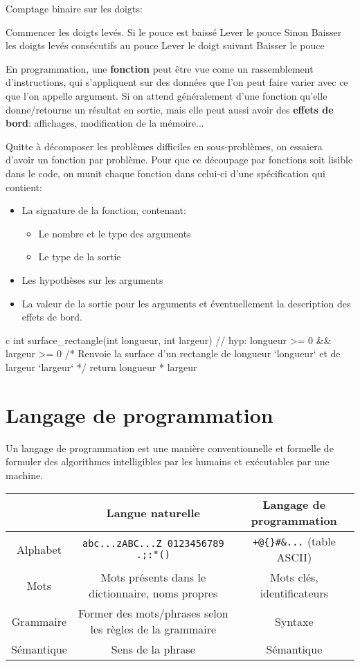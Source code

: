 \documentclass{scrartcl}
\begin{document}
		\exemple Comptage binaire sur les doigts:
		\begin{algotext}
Commencer les doigts levés.
Si le pouce est baissé
	Lever le pouce
Sinon
	Baisser les doigts levés consécutifs au pouce
	Lever le doigt suivant
	Baisser le pouce
		\end{algotext}

		En programmation, une \textbf{fonction} peut être vue come un rassemblement d'instructions, 
		qui s'appliquent sur des données que l'on peut faire varier avec ce que l'on appelle argument.
		Si on attend généralement d'une fonction qu'elle donne/retourne un résultat en sortie, 
		mais elle peut aussi avoir des \textbf{effets de bord}: affichages, modification de la mémoire...

		\rem Quitte à décomposer les problèmes difficiles en sous-problèmes, on essaiera d'avoir un fonction par problème.
		Pour que ce découpage par fonctions soit lisible dans le code, 
		on munit chaque fonction dans celui-ci d'une spécification qui contient:
		\begin{itemize}
			\item La signature de la fonction, contenant:
			\begin{itemize}
				\item Le nombre et le type des arguments
				\item Le type de la sortie
			\end{itemize}
			\item Les hypothèses sur les arguments
			\item La valeur de la sortie pour les arguments et éventuellement la description des effets de bord.
		\end{itemize}

		\exemple
		\begin{code}{c}
			int surface_rectangle(int longueur, int largeur)
			{
				// hyp: longueur >= 0 && largeur >= 0
				/* Renvoie la surface d'un rectangle de longueur `longueur` et de largeur `largeur` */
				return longueur * largeur
			}
		\end{code}
	\section{Langage de programmation}
		 Un langage de programmation est une manière conventionnelle et formelle
		de formuler des algorithmes intelligibles par les humains et exécutables par une machine.

		\begin{tabular}{| c | c | c |}
			\hline
			 & Langue naturelle & Langage de programmation \\
			 \hline
			 Alphabet & \Verb|abc...zABC...Z 0123456789 .;:"()| & \Verb|+@{}#&...| (table ASCII) \\
			 \hline 
			 Mots & Mots présents dans le dictionnaire, noms propres & Mots clés, identificateurs \\
			 \hline
			 Grammaire & Former des mots/phrases selon les règles de la grammaire & Syntaxe \\
			 \hline
			 Sémantique & Sens de la phrase & Sémantique \\
			 \hline
		\end{tabular}
	
			
\end{document}
